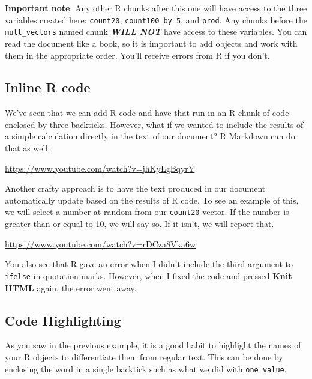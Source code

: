 \documentclass[]{tufte-book}
\begin{document}
\textbf{Important note}: Any other R chunks after this one will have access to the three variables created here: \texttt{count20}, \texttt{count100\_by\_5}, and \texttt{prod}. Any chunks before the \texttt{mult\_vectors} named chunk \textbf{\emph{WILL NOT}} have access to these variables. You can read the document like a book, so it is important to add objects and work with them in the appropriate order. You'll receive errors from R if you don't.

\subsection{Inline R code}\label{inline-r-code}

We've seen that we can add R code and have that run in an R chunk of code enclosed by three backticks. However, what if we wanted to include the results of a simple calculation directly in the text of our document? R Markdown can do that as well:

\vspace{0.1in}\begin{center}\footnotesize{\url{https://www.youtube.com/watch?v=jhKyLgBqyrY}}\end{center}\vspace{0.1in}

Another crafty approach is to have the text produced in our document automatically update based on the results of R code. To see an example of this, we will select a number at random from our \texttt{count20} vector. If the number is greater than or equal to 10, we will say so. If it isn't, we will report that.

\vspace{0.1in}\begin{center}\footnotesize{\url{https://www.youtube.com/watch?v=rDCza8Vka6w}}\end{center}\vspace{0.1in}

You also see that R gave an error when I didn't include the third argument to \texttt{ifelse} in quotation marks. However, when I fixed the code and pressed \textbf{Knit HTML} again, the error went away.

\subsection{Code Highlighting}\label{code-highlighting}

As you saw in the previous example, it is a good habit to highlight the names of your R objects to differentiate them from regular text. This can be done by enclosing the word in a single backtick such as what we did with \texttt{one\_value}.
\end{document}
